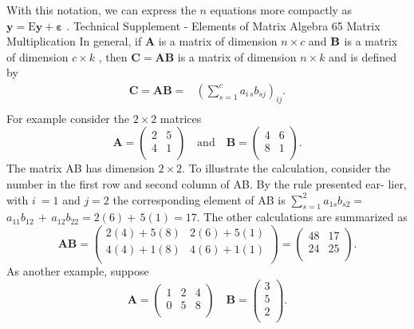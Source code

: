 \documentclass[11pt]{article}
\begin{document}
With this notation, we can express the \(n\) equations more compactly as \(\mathbf{y} \!=\! \textrm{E} \mathbf{y} \!+\! \boldsymbol{\varepsilon}\) .
 Technical Supplement - Elements of Matrix Algebra 65
 Matrix Multiplication
In general, if \(\mathbf{A}\) is a matrix of dimension \(n \times c\) and \({\bf B}\) is a matrix of dimension
\(c \times k\) , then \(\mathbf{C}=\mathbf{A} \mathbf{B}\) is a matrix of dimension \(n \times k\) and is defined by
\[
\begin{aligned} {\mathbf{C}=\mathbf{A} \mathbf{B}=} & {{} \left( \sum_{s=1}^{c} a_{i \, s} b_{s j} \right)_{i j} .} \\ \end{aligned}
\]
For example consider the \(2 \times2\) matrices
\[
\mathbf{A}=\left( \begin{matrix} {2} & {5} \\ {4} & {1} \\ \end{matrix} \right) \quad\mathrm{a n d} \quad\mathbf{B}=\left( \begin{matrix} {4} & {6} \\ {8} & {1} \\ \end{matrix} \right) .
\]
The matrix AB has dimension \(2 \times2 .\) To illustrate the calculation, consider the
number in the first row and second column of AB. By the rule presented ear-
lier, with \(i \ =1\) and \(j=2\) the corresponding element of AB is \(\sum_{s=1}^{2} a_{1 s} b_{s 2}=\)
\(a_{1 1} b_{1 2} \,+\, a_{1 2} b_{2 2}=2 ( 6 )+\, 5 ( 1 )=1 7 .\) The other calculations are summarized as
\[
\mathbf{A B}=\left( \begin{matrix} {2 ( 4 )+5 ( 8 )} & {2 ( 6 )+5 ( 1 )} \\ {4 ( 4 )+1 ( 8 )} & {4 ( 6 )+1 ( 1 )} \\ \end{matrix} \right)=\left( \begin{matrix} {4 8} & {1 7} \\ {2 4} & {2 5} \\ \end{matrix} \right) .
\]
As another example, suppose
\[
\mathbf{A}=\left( \begin{matrix} {1} & {2} & {4} \\ {0} & {5} & {8} \\ \end{matrix} \right) \quad\mathbf{B}=\left( \begin{matrix} {3} \\ {5} \\ {2} \\ \end{matrix} \right) .
\]
\end{document}
